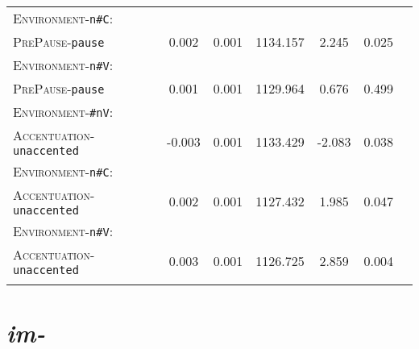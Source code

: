 \begin{table}[H]
{\begin{tabular}{lSSSSSS}
		\textsc{Environment}-\texttt{n\#C}:&&&&&\\
		\textsc{PrePause}-\texttt{pause} & 0.002 & 0.001 & 1134.157 & 2.245 & 0.025 \\ 
		
		\textsc{Environment}-\texttt{n\#V}:&&&&&\\
		\textsc{PrePause}-\texttt{pause} & \color{lsGuidelinesGray} 0.001 & \color{lsGuidelinesGray} 0.001 & \color{lsGuidelinesGray} 1129.964 & \color{lsGuidelinesGray} 0.676 & \color{lsGuidelinesGray} 0.499 \\ 
		
		\textsc{Environment}-\texttt{\#nV}:&&&&&\\
		\textsc{Accentuation}-\texttt{unaccented} & -0.003 & 0.001 & 1133.429 & -2.083 & 0.038 \\ 
		
		\textsc{Environment}-\texttt{n\#C}:&&&&&\\
		\textsc{Accentuation}-\texttt{unaccented} & 0.002 & 0.001 & 1127.432 & 1.985 & 0.047 \\ 
		
		\textsc{Environment}-\texttt{n\#V}:&&&&&\\
		\textsc{Accentuation}-\texttt{unaccented} & 0.003 & 0.001 & 1126.725 & 2.859 & 0.004 \\ 
		\lspbottomrule 
			\end{tabular}}
\end{table}


\section{\textit{im-}}

